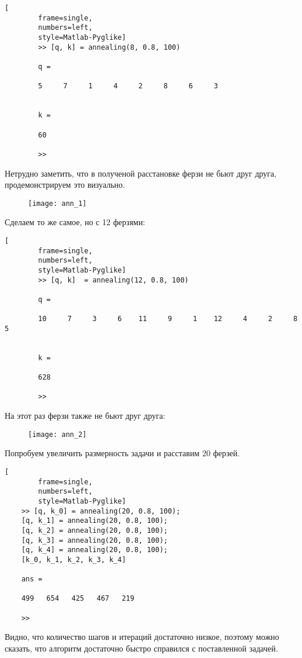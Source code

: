 \documentclass[../main.tex]{subfiles}
\begin{document}
	\begin{lstlisting}[
		frame=single,
		numbers=left,
		style=Matlab-Pyglike]
		>> [q, k] = annealing(8, 0.8, 100)
		
		q =
		
		5     7     1     4     2     8     6     3
		
		
		k =
		
		60
		
		>> 
	\end{lstlisting}
	
	Нетрудно заметить, что в полученой расстановке ферзи не бьют друг друга, продемонстрируем это визуально.
	\begin{figure}[H]
		\texttt{[image: ann\_1]}
	\end{figure}
	
	
	Сделаем то же самое, но с 12 ферзями:
	
	\begin{lstlisting}[
		frame=single,
		numbers=left,
		style=Matlab-Pyglike]
		>> [q, k]  = annealing(12, 0.8, 100)
		
		q =
		
		10     7     3     6    11     9     1    12     4     2     8     5
		
		
		k =
		
		628
		
		>>  
	\end{lstlisting}
	
	На этот раз ферзи также не бьют друг друга:
	
	\begin{figure}[H]
		\texttt{[image: ann\_2]}
	\end{figure}
	
	
	
	Попробуем увеличить размерность задачи и расставим 20 ферзей.
	
	\begin{lstlisting}[
		frame=single,
		numbers=left,
		style=Matlab-Pyglike]
	>> [q, k_0] = annealing(20, 0.8, 100);
	[q, k_1] = annealing(20, 0.8, 100);
	[q, k_2] = annealing(20, 0.8, 100);
	[q, k_3] = annealing(20, 0.8, 100);
	[q, k_4] = annealing(20, 0.8, 100);
	[k_0, k_1, k_2, k_3, k_4]
	
	ans =
	
	499   654   425   467   219
	
	>> 
	\end{lstlisting}
	
	Видно, что количество шагов и итераций достаточно низкое, поэтому можно сказать, что алгоритм достаточно быстро справился с поставленной задачей.
	
\end{document}
